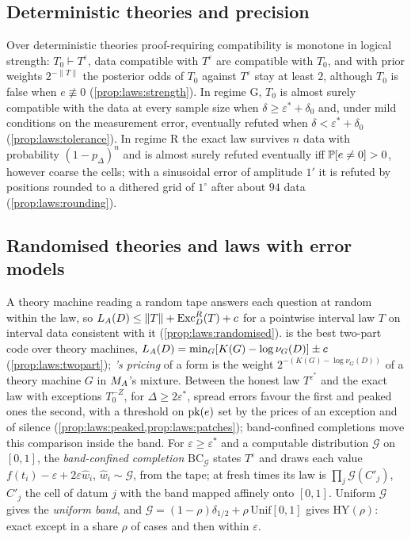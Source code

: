 \subsection{Deterministic theories and precision}\label{sec:laws:strength}

Over deterministic theories proof-requiring compatibility is monotone in logical strength: $T_0\vdash T^\varepsilon$, data compatible with $T^\varepsilon$ are compatible with $T_0$, and with prior weights $2^{-\lVert T\rVert}$ the posterior odds of $T_0$ against $T^\varepsilon$ stay at least $2$, although $T_0$ is false when $e\not\equiv0$ (\cref{prop:laws:strength}). In regime G, $T_0$ is almost surely compatible with the data at every sample size when $\delta\ge\varepsilon^*+\delta_0$ and, under mild conditions on the measurement error, eventually refuted when $\delta<\varepsilon^*+\delta_0$ (\cref{prop:laws:tolerance}). In regime R the exact law survives $n$ data with probability $(1-p_\Delta)^n$ and is almost surely refuted eventually iff $\mathbb{P}[e\ne0]>0$, however coarse the cells; with a sinusoidal error of amplitude $1'$ it is refuted by positions rounded to a dithered grid of $1^\circ$ after about $94$ data (\cref{prop:laws:rounding}).

\subsection{Randomised theories and laws with error models}\label{sec:laws:random}

A theory machine reading a random tape answers each question at random within the law, so $L_{A}(D)\le\lVert T\rVert+\mathrm{Exc}^R_D(T)+c$ for a pointwise interval law $T$ on interval data consistent with it (\cref{prop:laws:randomised}). \SAIabbr is the best two-part code over theory machines, $L_{A}(D)=\min_G[K(G)-\log\nu_G(D)]\pm c$ (\cref{prop:laws:twopart}); \emph{\SAIabbr's pricing} of a form is the weight $2^{-(K(G)-\log\nu_G(D))}$ of a theory machine $G$ in $M_{A}$'s mixture. Between the honest law $T^{\varepsilon^*}$ and the exact law with exceptions $T_0^{-Z}$, for $\Delta\ge2\varepsilon^*$, spread errors favour the first and peaked ones the second, with a threshold on $\mathrm{pk}(e)$ set by the prices of an exception and of silence (\cref{prop:laws:peaked,prop:laws:patches}); band-confined completions move this comparison inside the band. For $\varepsilon\ge\varepsilon^*$ and a computable distribution $\mathcal G$ on $[0,1]$, the \emph{band-confined completion} $\mathrm{BC}_{\mathcal G}$ states $T^\varepsilon$ and draws each value $f(t_i)-\varepsilon+2\varepsilon\hat w_i$, $\hat w_i\sim\mathcal G$, from the tape; at fresh times its law is $\prod_j\mathcal G(C'_j)$, $C'_j$ the cell of datum $j$ with the band mapped affinely onto $[0,1]$. Uniform $\mathcal G$ gives the \emph{uniform band}, and $\mathcal G=(1-\rho)\delta_{1/2}+\rho\,\mathrm{Unif}[0,1]$ gives $\mathrm{HY}(\rho)$: exact except in a share $\rho$ of cases and then within $\varepsilon$.

